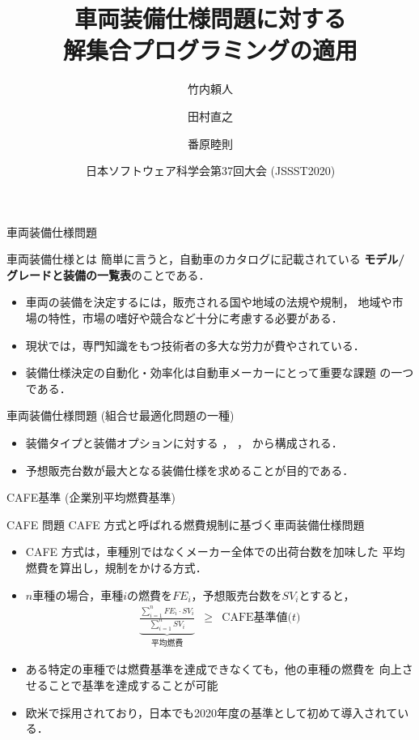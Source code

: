 \documentclass[dvipdfmx, 11pt]{beamer}
\title{車両装備仕様問題に対する\\解集合プログラミングの適用}
\author{竹内頼人\inst{1} \and 田村直之\inst{2} \and 番原睦則\inst{1}}
\institute{\inst{1}名古屋大学 大学院情報学研究科 \and \inst{2}神戸大学 情報基盤センター}
\date{日本ソフトウェア科学会第37回大会 (JSSST2020)}
\begin{document}
\frame{\titlepage}
\begin{frame}{車両装備仕様問題}
  \begin{alertblock}{車両装備仕様とは}
    簡単に言うと，自動車のカタログに記載されている
    \textbf{モデル/グレードと装備の一覧表}のことである．
  \end{alertblock}

  \begin{itemize}
  \item 車両の装備を決定するには，販売される国や地域の法規や規制，
    地域や市場の特性，市場の嗜好や競合など十分に考慮する必要がある．
  \item 現状では，専門知識をもつ技術者の多大な労力が費やされている．
  \item 装備仕様決定の自動化・効率化は自動車メーカーにとって重要な課題
    の一つである．
  \end{itemize}

  \begin{block}{車両装備仕様問題 (組合せ最適化問題の一種)}
    \begin{itemize}
    \item 装備タイプと装備オプションに対する
      ，
      ，
      から構成される．
    \item 予想販売台数が最大となる装備仕様を求めることが目的である．
    \end{itemize}
  \end{block}
\end{frame}
\begin{frame}{CAFE基準 (企業別平均燃費基準)}
  \begin{alertblock}{CAFE 問題}\centering
    CAFE 方式と呼ばれる燃費規制に基づく車両装備仕様問題~\footnotemark
  \end{alertblock}

  \begin{itemize}
  \item CAFE 方式は，車種別ではなくメーカー全体での出荷台数を加味した
    平均燃費を算出し，規制をかける方式．
  \item $n$車種の場合，車種$i$の燃費を$FE_i$，予想販売台数を$SV_i$とすると，
    \[
      \begin{array}{lcr}
        \underbrace{
        \frac{\sum_{i=1}^{n} FE_{i}\cdot SV_{i}}
        {\sum_{i=1}^{n} SV_{i}}}_{\textrm{平均燃費}
        }
        &
        \geq 
        &
        \textrm{CAFE基準値($t$)}
      \end{array}
    \]
  \item ある特定の車種では燃費基準を達成できなくても，他の車種の燃費を
    向上させることで基準を達成することが可能
  \item 欧米で採用されており，日本でも2020年度の基準として初めて導入されている．
  \end{itemize}
\end{frame}
\end{document}

